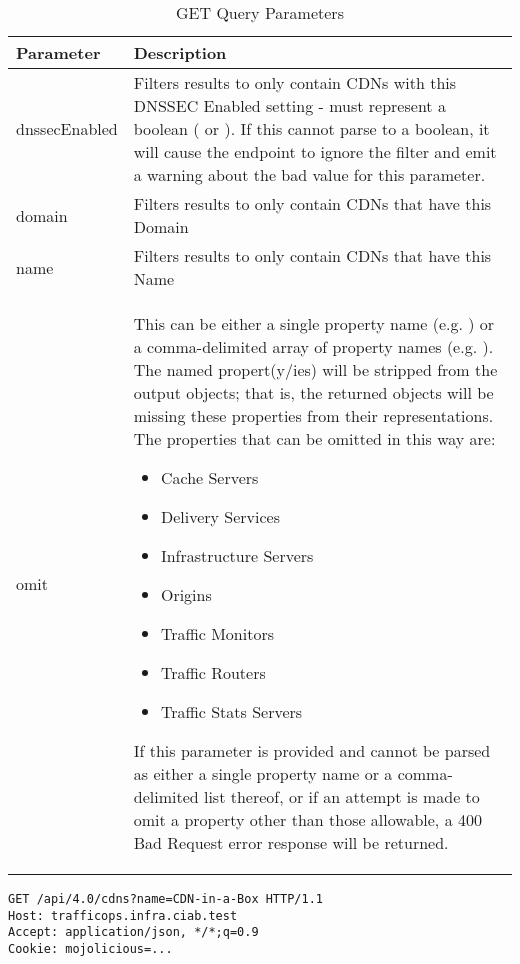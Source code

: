\begin{table}[h]
	\centering
	\caption{GET  Query Parameters\label{tbl:cdns:get:qparams}}
	\begin{tabularx}{\linewidth}{|l|X|}
		\hline
		\textbf{Parameter} & \textbf{Description}\\
		\hline
		dnssecEnabled & Filters results to only contain CDNs with this DNSSEC
			Enabled setting - must represent a boolean (\code{true} or
			\code{false}). If this cannot parse to a boolean, it will cause the
			endpoint to ignore the filter and emit a warning about the bad
			value for this parameter.\\
		\hline
		domain & Filters results to only contain CDNs that have this Domain\\
		\hline
		name & Filters results to only contain CDNs that have this Name\\
		\hline
		omit & This can be either a single property name (e.g.
			\code{omit=cacheServers}) or a comma-delimited array of property
			names (e.g. \code{omit=trafficMonitors,trafficRouters}). The named
			propert(y/ies) will be stripped from the output objects; that is,
			the returned objects will be missing these properties from their
			representations. The properties that can be omitted in this way
			are:
			\begin{itemize}
				\item Cache Servers
				\item Delivery Services
				\item Infrastructure Servers
				\item Origins
				\item Traffic Monitors
				\item Traffic Routers
				\item Traffic Stats Servers
			\end{itemize}
			If this parameter is provided and cannot be parsed as either a
			single property name or a comma-delimited list thereof, or if an
			attempt is made to omit a property other than those allowable, a
			400 Bad Request error response will be returned.\\
		\hline
	\end{tabularx}
\end{table}

\begin{codelisting}
\begin{verbatim}
GET /api/4.0/cdns?name=CDN-in-a-Box HTTP/1.1
Host: trafficops.infra.ciab.test
Accept: application/json, */*;q=0.9
Cookie: mojolicious=...

\end{verbatim}
\end{codelisting}

